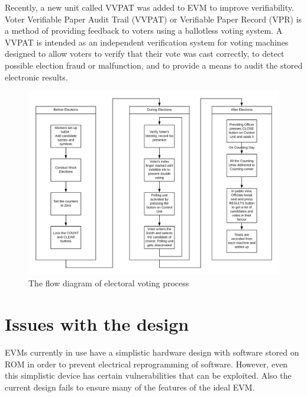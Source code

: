 \documentclass[a4paper,12pt,openany]{book}
\begin{document}
Recently, a new unit called VVPAT was added to EVM to improve verifiability. Voter Verifiable Paper Audit Trail (VVPAT) or Verifiable Paper Record (VPR) is a method of providing feedback to voters using a ballotless voting system. A VVPAT is intended as an independent verification system for voting machines designed to allow voters to verify that their vote was cast correctly, to detect possible election fraud or malfunction, and to provide a means to audit the stored electronic results.
\newpage
\begin{figure}[!hb]
\centering
\includegraphics[scale=0.2]{FlowCurrent.PNG}
\caption{The flow diagram of electoral voting process}
\end{figure}
\newpage
\section{Issues with the design}
EVMs currently in use have a simplistic hardware design with software stored on ROM in order to prevent electrical reprogramming of software. However, even this simplistic device has certain vulnerabilities that can be exploited. Also the current design fails to ensure many of the features of the ideal EVM.
\end{document}
